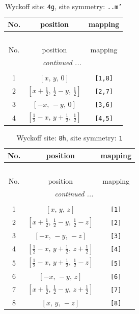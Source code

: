 \documentclass[fleqn,8pt]{jsarticle}
\begin{document}
\renewcommand{\arraystretch}{1.2}
\begin{longtable}{ccc}
\caption{Wyckoff site: {\tt 4g}, site symmetry: {\tt ..m'}}
 \\
 \hline \hline
No. & position & mapping \\ \hline \endfirsthead

\multicolumn{2}{l}{\tablename\ \thetable{}} \\
 \hline \hline
No. & position & mapping \\ \hline \endhead

 \hline \hline
\multicolumn{2}{r}{\footnotesize\it continued ...} \\ \endfoot

 \hline \hline
\multicolumn{2}{r}{} \\ \endlastfoot

1 & $\left[ x,\, y,\, 0 \right]$ & {\tt [1,8]} \\ \hline
2 & $\left[ x + \frac{1}{2},\, \frac{1}{2} - y,\, \frac{1}{2} \right]$ & {\tt [2,7]} \\ \hline
3 & $\left[ - x,\, - y,\, 0 \right]$ & {\tt [3,6]} \\ \hline
4 & $\left[ \frac{1}{2} - x,\, y + \frac{1}{2},\, \frac{1}{2} \right]$ & {\tt [4,5]} \\
\end{longtable}
\renewcommand{\arraystretch}{1.2}
\begin{longtable}{ccc}
\caption{Wyckoff site: {\tt 8h}, site symmetry: {\tt 1}}
 \\
 \hline \hline
No. & position & mapping \\ \hline \endfirsthead

\multicolumn{2}{l}{\tablename\ \thetable{}} \\
 \hline \hline
No. & position & mapping \\ \hline \endhead

 \hline \hline
\multicolumn{2}{r}{\footnotesize\it continued ...} \\ \endfoot

 \hline \hline
\multicolumn{2}{r}{} \\ \endlastfoot

1 & $\left[ x,\, y,\, z \right]$ & {\tt [1]} \\ \hline
2 & $\left[ x + \frac{1}{2},\, \frac{1}{2} - y,\, \frac{1}{2} - z \right]$ & {\tt [2]} \\ \hline
3 & $\left[ - x,\, - y,\, - z \right]$ & {\tt [3]} \\ \hline
4 & $\left[ \frac{1}{2} - x,\, y + \frac{1}{2},\, z + \frac{1}{2} \right]$ & {\tt [4]} \\ \hline
5 & $\left[ \frac{1}{2} - x,\, y + \frac{1}{2},\, \frac{1}{2} - z \right]$ & {\tt [5]} \\ \hline
6 & $\left[ - x,\, - y,\, z \right]$ & {\tt [6]} \\ \hline
7 & $\left[ x + \frac{1}{2},\, \frac{1}{2} - y,\, z + \frac{1}{2} \right]$ & {\tt [7]} \\ \hline
8 & $\left[ x,\, y,\, - z \right]$ & {\tt [8]} \\
\end{longtable}
\end{document}
